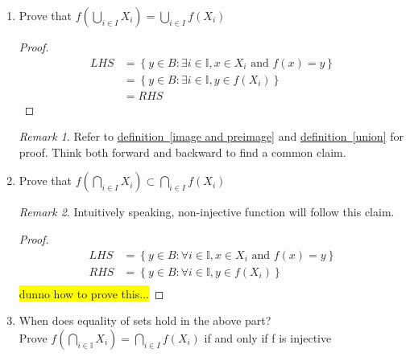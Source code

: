 \documentclass[11pt]{article}
\theoremstyle{plain}%
\theoremstyle{definition}
\theoremstyle{remark}
\newtheorem*{rem}{Remark}
\newcommand{\I}{\mathbb{I}}
\newcommand{\hilight}[1]{\colorbox{yellow}{#1}}
\begin{document}
\begin{enumerate}
  \item Prove that $f\left(\bigcup_{i\in I} X_{i}\right) = \bigcup_{i\in I} f(X_{i})$
    \begin{proof}
      $ $\\
      \[
      \begin{split}
        LHS &= \left\{ y \in B: \exists i\in \I, x\in X_i \text{ and } f(x)=y\right\} \\
        &=  \left\{ y \in B: \exists i\in \I, y\in f(X_i)\right\} \\
        &= RHS
      \end{split}
      \]
    \end{proof}

    \begin{rem}
      Refer to \hyperref[image and preimage]{definition~\eqref{image and preimage}} and \hyperref[union]{definition~\eqref{union}} for proof. Think both forward and backward to find a common claim.
    \end{rem}
  \item Prove that $f\left(\bigcap_{i\in I} X_{i}\right) \subset \bigcap_{i\in I} f(X_{i})$
    \begin{rem}
      Intuitively speaking, non-injective function will follow this claim.
    \end{rem}
    \begin{proof}
      $ $\\
      \[
      \begin{align}
        LHS &= \left\{ y \in B: \forall i\in \I, x\in X_i \text{ and } f(x)=y\right\} \\
        RHS &= \left\{ y \in B: \forall i\in \I, y\in f(X_i)\right\} \\
      \end{align}
      \]
      \hilight{dunno how to prove this...}
    \end{proof}
  \item When does equality of sets hold in the above part? \\
    Prove $f\left(\bigcap_{i\in \I} X_{i}\right) = \bigcap_{i\in I} f(X_{i})$ if and only if f is injective


\end{enumerate}
\end{document}
